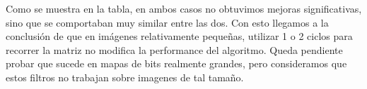 Como se muestra en la tabla, en ambos casos no obtuvimos mejoras significativas, sino que se comportaban muy similar entre las dos. Con esto llegamos a la conclusión de que en imágenes relativamente pequeñas, utilizar 1 o 2 ciclos para recorrer la matriz no modifica la performance del algoritmo. Queda pendiente probar que sucede en mapas de bits realmente grandes, pero consideramos que estos filtros no trabajan sobre imagenes de tal tamaño.

